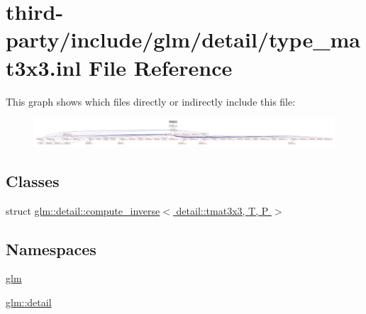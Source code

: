 \hypertarget{type__mat3x3_8inl}{}\section{third-\/party/include/glm/detail/type\+\_\+mat3x3.inl File Reference}
\label{type__mat3x3_8inl}
This graph shows which files directly or indirectly include this file\+:
\nopagebreak
\begin{figure}[H]
\begin{center}
\leavevmode
\includegraphics[width=350pt]{type__mat3x3_8inl__dep__incl}
\end{center}
\end{figure}
\subsection*{Classes}
\begin{DoxyCompactItemize}
\item 
struct \hyperlink{structglm_1_1detail_1_1compute__inverse_3_01detail_1_1tmat3x3_00_01_t_00_01_p_01_4}{glm\+::detail\+::compute\+\_\+inverse$<$ detail\+::tmat3x3, T, P $>$}
\end{DoxyCompactItemize}
\subsection*{Namespaces}
\begin{DoxyCompactItemize}
\item 
 \hyperlink{namespaceglm}{glm}
\item 
 \hyperlink{namespaceglm_1_1detail}{glm\+::detail}
\end{DoxyCompactItemize}
